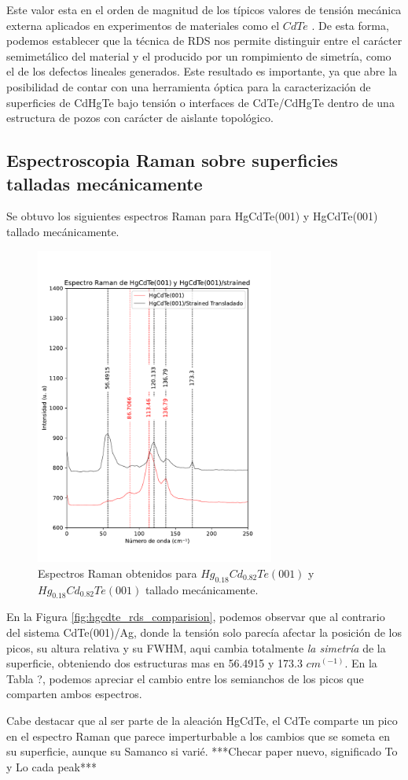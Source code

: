 Este valor esta en el orden de magnitud de los típicos valores de tensión mecánica externa aplicados en experimentos 
de materiales como el $ CdTe $ \cite{LastrasMartnez2010}. De esta forma, podemos establecer que la técnica de RDS nos 
permite distinguir entre el carácter semimetálico del material y el producido por un rompimiento de simetría,
como el de los defectos lineales generados. Este resultado es importante, ya que abre la posibilidad de contar con una 
herramienta óptica para la caracterización de superficies de CdHgTe bajo tensión o interfaces de CdTe/CdHgTe dentro de 
una estructura de pozos con carácter de aislante topológico.
\newpage

\subsection{Espectroscopia Raman sobre superficies talladas mecánicamente}
\label{sec:chap4-hgcdte-raman}

Se obtuvo los siguientes espectros Raman para HgCdTe(001) y HgCdTe(001) tallado mecánicamente.
\begin{figure}[h!]
    \centering
    \includegraphics[width=0.7\textwidth]{figures/chap4/raman-HgCdTes-250-T.pdf}
        \caption{Espectros Raman obtenidos para $ Hg_{0.18}Cd_{0.82}Te (001)$ y 
        $ Hg_{0.18}Cd_{0.82}Te (001)$ tallado mecánicamente.}
    \label{fig:hgcdte_rds_stress}
\end{figure}

En la Figura \ref{fig:hgcdte_rds_comparision}, podemos observar que al contrario del sistema 
CdTe(001)/Ag, donde la tensión solo parecía afectar la posición de los picos, su altura relativa 
y su FWHM, aqui cambia totalmente \textit{la simetría} de la superficie, obteniendo dos estructuras 
mas en 56.4915 y 173.3 $cm^(-1)$. En la Tabla ?, podemos apreciar el cambio entre los semianchos 
de los picos que comparten ambos espectros.

Cabe destacar que al ser parte de la aleación HgCdTe, el CdTe comparte un pico en el espectro Raman 
que parece imperturbable a los cambios que se someta en su superficie, aunque su Samanco si varié.
***Checar paper nuevo, significado To y Lo cada peak*** 
